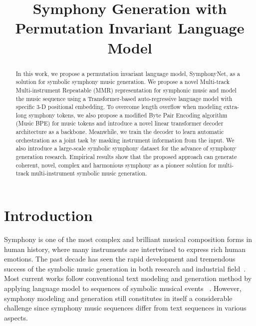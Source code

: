\documentclass{article}
\title{Symphony Generation with Permutation Invariant Language Model}
\begin{document}
\maketitle
\begin{abstract}
In this work, we propose a permutation invariant language model, SymphonyNet, as a solution for symbolic symphony music generation. We propose a novel Multi-track Multi-instrument Repeatable (MMR) representation for symphonic music and model the music sequence using a Transformer-based auto-regressive language model with specific 3-D positional embedding. To overcome length overflow when modeling extra-long symphony tokens, we also propose a modified Byte Pair Encoding algorithm (Music BPE) for music tokens and introduce a novel linear transformer decoder architecture as a backbone. Meanwhile, we train the decoder to learn automatic orchestration as a joint task by masking instrument information from the input. We also introduce a large-scale symbolic symphony dataset for the advance of symphony generation research. Empirical results show that the proposed approach can generate coherent, novel, complex and harmonious symphony as a pioneer solution for multi-track multi-instrument symbolic music generation.
\end{abstract}
\section{Introduction}
\label{INTRO}
Symphony is one of the most complex and brilliant musical composition forms in human history, where many instruments are intertwined to express rich human emotions. The past decade has seen the rapid development and tremendous success of the symbolic music generation in both research and industrial field~\cite{deepbach,midinet,musicvae}. Most current works follow conventional text modeling and generation method by applying language model to sequences of symbolic musical events ~\cite{mt,popmag,cwt}. However, symphony modeling and generation still constitutes in itself a considerable challenge since symphony
music sequences differ from text sequences in various aspects.
\end{document}
